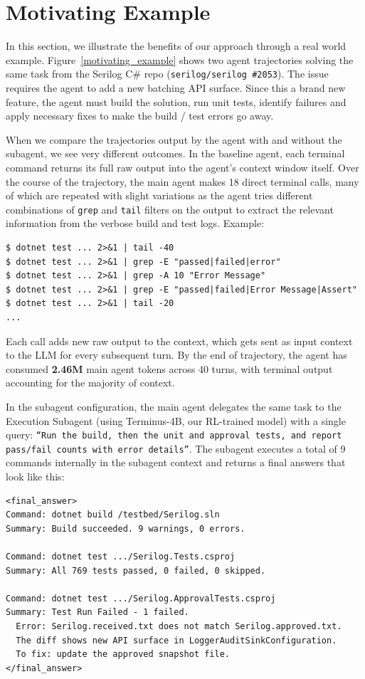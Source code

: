 \documentclass[sigconf,review]{acmart}
\begin{document}
\section{Motivating Example}
In this section, we illustrate the benefits of our approach through a real world example. Figure~\ref{motivating_example} shows two agent trajectories solving the same task from the Serilog C\# repo (\texttt{serilog/serilog \#2053}). The issue requires the agent to add a new batching API surface. Since this a brand new feature, the agent must build the solution, run unit tests, identify failures and apply necessary fixes to make the build / test errors go away.

When we compare the trajectories output by the agent with and without the subagent, we see very different outcomes. In the baseline agent, each terminal command returns its full raw output into the agent's context window itself. Over the course of the trajectory, the main agent makes 18 direct terminal calls, many of which are repeated with slight variations as the agent tries different combinations of \texttt{grep} and \texttt{tail} filters on the output to extract the relevant information from the verbose build and test logs. Example:

\begin{lstlisting}[basicstyle=\ttfamily\tiny]
$ dotnet test ... 2>&1 | tail -40
$ dotnet test ... 2>&1 | grep -E "passed|failed|error"
$ dotnet test ... 2>&1 | grep -A 10 "Error Message"
$ dotnet test ... 2>&1 | grep -E "passed|failed|Error Message|Assert"
$ dotnet test ... 2>&1 | tail -20
...
\end{lstlisting}

Each call adds new raw output to the context, which gets sent as input context to the LLM for every subsequent turn. By the end of trajectory, the agent has consumed \textbf{2.46M} main agent tokens across 40 turns, with terminal output accounting for the majority of context.

In the subagent configuration, the main agent delegates the same task to the Execution Subagent (using Terminus-4B, our RL-trained model) with a single query: \texttt{``Run the build, then the unit and approval tests, and report pass/fail counts with error details''}. The subagent executes a total of 9 commands internally in the subagent context and returns a final answers that look like this: 
\begin{lstlisting}[basicstyle=\ttfamily\tiny]
<final_answer>
Command: dotnet build /testbed/Serilog.sln
Summary: Build succeeded. 9 warnings, 0 errors.

Command: dotnet test .../Serilog.Tests.csproj
Summary: All 769 tests passed, 0 failed, 0 skipped.

Command: dotnet test .../Serilog.ApprovalTests.csproj
Summary: Test Run Failed - 1 failed.
  Error: Serilog.received.txt does not match Serilog.approved.txt.
  The diff shows new API surface in LoggerAuditSinkConfiguration.
  To fix: update the approved snapshot file.
</final_answer>
\end{lstlisting}
\end{document}
